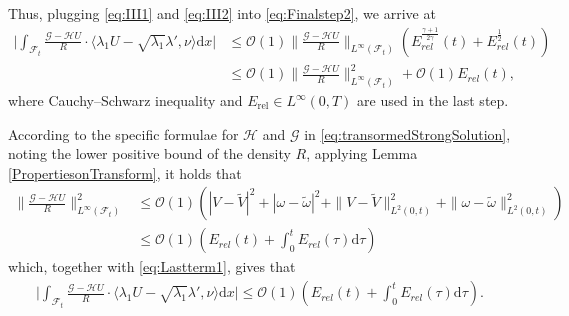 \documentclass[11pt,twoside,reqno]{amsart}
\numberwithin{equation}{section}
\numberwithin{figure}{section}
\newcommand{\qnt}[1]{\left(#1\right)}
\begin{document}
Thus, plugging \eqref{eq:III1} and \eqref{eq:III2} into \eqref{eq:Finalstep2}, we arrive at 
\begin{equation}\label{eq:Lastterm1}
    \begin{aligned}
        \big|\int_{\mathcal{F}_t} \frac{\mathcal{G}-\mathcal{H} U}{R}\cdot\langle\lambda_1U-\sqrt{\lambda_1}\lambda',\nu\rangle\mathrm{d}x\big|&\leq \mathcal{O}(1)\|\frac{\mathcal{G}-\mathcal{H} U}{R}\|_{L^{\infty}(\mathcal{F}_t)}\qnt{E^{\frac{\gamma+1}{2\gamma}}_{rel}(t)+E^{\frac{1}{2}}_{rel}(t)}\\&\leq \mathcal{O}(1) \|\frac{\mathcal{G}-\mathcal{H} U}{R}\|_{L^{\infty}(\mathcal{F}_t)}^2+\mathcal{O}(1)E_{rel}(t),
    \end{aligned}
\end{equation}
where Cauchy–Schwarz inequality and \(E_{\mathrm{rel}}\in L^\infty(0,T)\) are used in the last step.

According to the specific formulae for $\mathcal{H}$ and $\mathcal{G}$ in \eqref{eq:transormedStrongSolution}, noting the lower positive bound of the density $R$, applying Lemma \ref{PropertiesonTransform}, it holds that 
\begin{equation}
    \begin{aligned}
        \|\frac{\mathcal{G}-\mathcal{H}U}{R}\|^2_{L^{\infty}(\mathcal{F}_t)}&\leq \mathcal{O}(1)\qnt{|V-\tilde{V}|^2+|\omega-\tilde{\omega}|^2+\|V-\tilde{V}\|^2_{L^2(0,t)}+\|\omega-\tilde{\omega}\|^2_{L^2(0,t)}}\\&\leq \mathcal{O}(1)\qnt{E_{rel}(t)+\int_0^tE_{rel}(\tau)\mathrm{d}\tau}
    \end{aligned}
\end{equation}
which, together with \eqref{eq:Lastterm1}, gives that 
\begin{equation}\label{eq:Lastterm2}
    \begin{aligned}
        \big|\int_{\mathcal{F}_t} \frac{\mathcal{G}-\mathcal{H} U}{R}\cdot\langle\lambda_1U-\sqrt{\lambda_1}\lambda',\nu\rangle\mathrm{d}x\big|\leq \mathcal{O}(1)\qnt{E_{rel}(t)+\int_0^tE_{rel}(\tau)\mathrm{d}\tau}.
    \end{aligned}
\end{equation}
\end{document}
